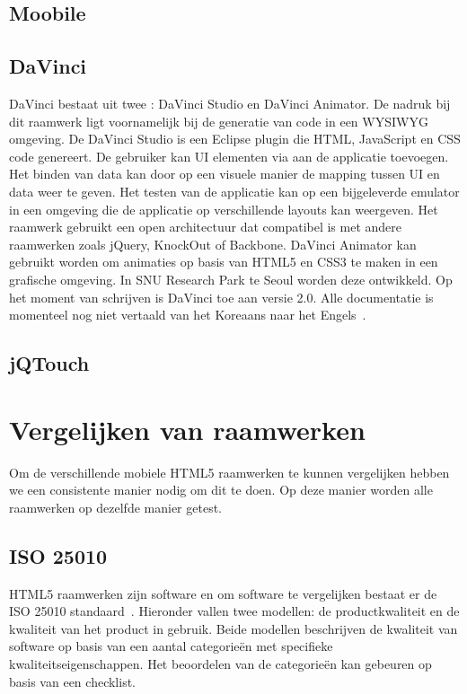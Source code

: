 \subsection{Moobile} %

\subsection{DaVinci}%
DaVinci bestaat uit twee :  DaVinci Studio en DaVinci Animator.
De nadruk bij dit raamwerk ligt voornamelijk bij de generatie van code in een WYSIWYG omgeving.
De DaVinci Studio is een Eclipse plugin die HTML,  JavaScript en CSS code genereert.
De gebruiker kan UI elementen via  aan de applicatie toevoegen.
Het binden van data kan door op een visuele manier de mapping tussen UI en data weer te geven.
Het testen van de applicatie kan op een bijgeleverde emulator in een  omgeving die de applicatie op verschillende layouts kan weergeven.
Het raamwerk gebruikt een open architectuur dat compatibel is met andere  raamwerken zoals jQuery, KnockOut of Backbone.
DaVinci Animator kan gebruikt worden om animaties op basis van HTML5 en CSS3 te maken in een grafische omgeving.
In SNU Research Park te Seoul worden deze  ontwikkeld.
Op het moment van schrijven is DaVinci toe aan versie 2.0.  
Alle documentatie is momenteel nog niet vertaald van het Koreaans naar het Engels~\cite{Incross}.


\subsection{jQTouch}%


\section{Vergelijken van raamwerken} 
\label{sec:vergelijken-raamwerken}
Om de verschillende mobiele HTML5 raamwerken te kunnen vergelijken hebben we een consistente manier nodig om dit te doen.  
Op deze manier worden alle raamwerken op dezelfde manier getest.

\subsection{ISO 25010}
HTML5 raamwerken zijn software en om software te vergelijken bestaat er de ISO 25010 standaard~\cite{Standard2010}.  
Hieronder vallen twee modellen:  de productkwaliteit en de kwaliteit van het product in gebruik.  
Beide modellen beschrijven de kwaliteit van software op basis van een aantal categorieën met specifieke kwaliteitseigenschappen. 
Het beoordelen van de categorieën kan gebeuren op basis van een checklist. 

